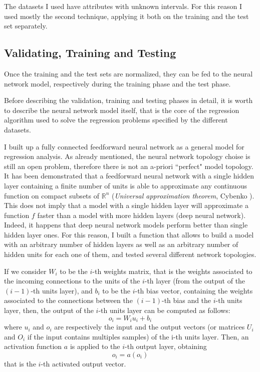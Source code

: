 \documentclass[10pt,journal,A4paper,compsoc,epsfig]{IEEEtran}
\begin{document}
The datasets I used have attributes with unknown intervals. For this reason I used mostly the second technique, applying it both on the training and the test set separately.

\subsection{Validating, Training and Testing}

Once the training and the test sets are normalized, they can be fed to the neural network model, respectively during the training phase and the test phase.

Before describing the validation, training and testing phases in detail, it is worth to describe the neural network model itself, that is the core of the regression algorithm used to solve the regression problems specified by the different datasets.

I built up a fully connected feedforward neural network as a general model for regression analysis. As already mentioned, the neural network topology choise is still an open problem, therefore there is not an a-priori ``perfect" model topology. It has been demonstrated that a feedforward neural network with a single hidden layer containing a finite number of units is able to approximate any continuous function on compact subsets of $\mathbb{R}^n$ (\textit{Universal approximation theorem}, Cybenko \cite{cybenko1989approximation}). This does not imply that a model with a single hidden layer will approximate a function $f$ faster than a model with more hidden layers (deep neural network). Indeed, it happens that deep neural network models perform better than single hidden layer ones.
For this reason, I built a function that allows to build a model with an arbitrary number of hidden layers as well as an arbitrary number of hidden units for each one of them, and tested several different network topologies.

If we consider $W_i$ to be the $i$-th weights matrix, that is the weights associated to the incoming connections to the units of the $i$-th layer (from the output of the $(i-1)$-th units layer), and $b_i$ to be the $i$-th bias vector, containing the weights associated to the connections between the $(i-1)$-th bias and the $i$-th units layer, then, the output of the $i$-th units layer can be computed as follows:
\begin{equation}
o_i = W_iu_i + b_i 
\end{equation}
where $u_i$ and $o_i$ are respectively the input and the output vectors (or matrices $U_i$ and $O_i$ if the input contains multiples samples) of the i-th units layer. Then, an activation function $a$ is applied to the $i$-th output layer, obtaining
\begin{equation}
o_i = a(o_i)
\end{equation}
that is the $i$-th activated output vector.
\end{document}

